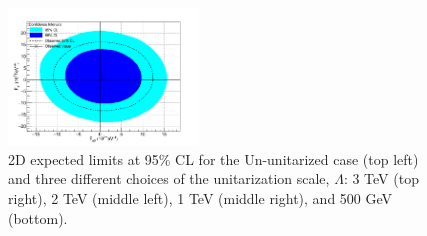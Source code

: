 \begin{figure}[htp]
\includegraphics[width=0.45\textwidth]{figures/aQGC/lll-500.png}
\caption{2D expected limits at 95\% CL for the Un-unitarized case (top left)
and three different choices of the unitarization scale, $\Lambda$:
3 TeV (top right), 2 TeV (middle left), 1 TeV (middle right), and 500 GeV (bottom).}
\label{fig:WWW2D}
\end{figure}  


  

  

  
